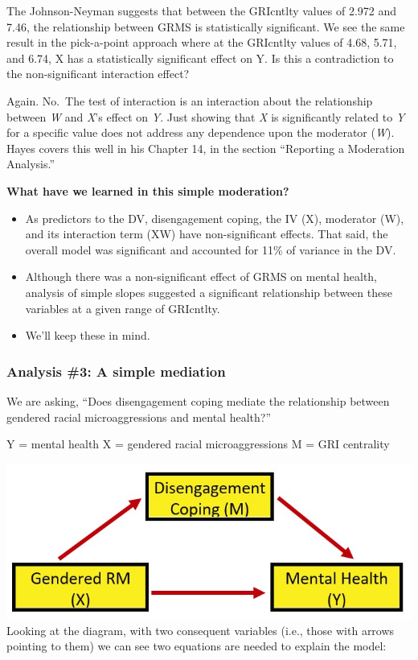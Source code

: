 \documentclass[
]{book}
\providecommand{\tightlist}{%
  \setlength{\itemsep}{0pt}\setlength{\parskip}{0pt}}
\begin{document}
The Johnson-Neyman suggests that between the GRIcntlty values of 2.972 and 7.46, the relationship between GRMS is statistically significant. We see the same result in the pick-a-point approach where at the GRIcntlty values of 4.68, 5.71, and 6.74, X has a statistically significant effect on Y. Is this a contradiction to the non-significant interaction effect?

Again. No.~The test of interaction is an interaction about the relationship between \emph{W} and \emph{X}'s effect on \emph{Y}. Just showing that \emph{X} is significantly related to \emph{Y} for a specific value does not address any dependence upon the moderator (\emph{W}). Hayes \citeyearpar{hayes_introduction_2018} covers this well in his Chapter 14, in the section ``Reporting a Moderation Analysis.''

\textbf{What have we learned in this simple moderation?}

\begin{itemize}
\tightlist
\item
  As predictors to the DV, disengagement coping, the IV (X), moderator (W), and its interaction term (XW) have non-significant effects. That said, the overall model was significant and accounted for 11\% of variance in the DV.
\item
  Although there was a non-significant effect of GRMS on mental health, analysis of simple slopes suggested a significant relationship between these variables at a given range of GRIcntlty.
\item
  We'll keep these in mind.
\end{itemize}

\hypertarget{analysis-3-a-simple-mediation}{%
\subsubsection{Analysis \#3: A simple mediation}\label{analysis-3-a-simple-mediation}}

We are asking, ``Does disengagement coping mediate the relationship between gendered racial microaggressions and mental health?''

Y = mental health
X = gendered racial microaggressions
M = GRI centrality

\includegraphics{images/ModMed/LewisMed.jpg}
Looking at the diagram, with two consequent variables (i.e., those with arrows pointing to them) we can see two equations are needed to explain the model:
\end{document}

